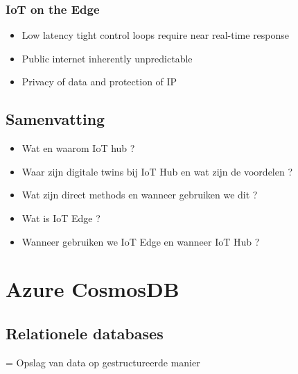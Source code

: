 \documentclass{article}
\begin{document}
\subsubsection{IoT on the Edge}

\begin{itemize}
    \item Low latency tight control loops require near real-time response
    \item Public internet inherently unpredictable
    \item Privacy of data and protection of IP
\end{itemize}

\subsection{Samenvatting}

\begin{itemize}
    \item Wat en waarom IoT hub ?
    \item Waar zijn digitale twins bij IoT Hub en wat zijn de voordelen ?
    \item Wat zijn direct methods en wanneer gebruiken we dit ?
    \item Wat is IoT Edge ?
    \item Wanneer gebruiken we IoT Edge en wanneer IoT Hub ?
\end{itemize}

\section{Azure CosmosDB}

\subsection{Relationele databases}

= Opslag van data op gestructureerde manier
\end{document}
